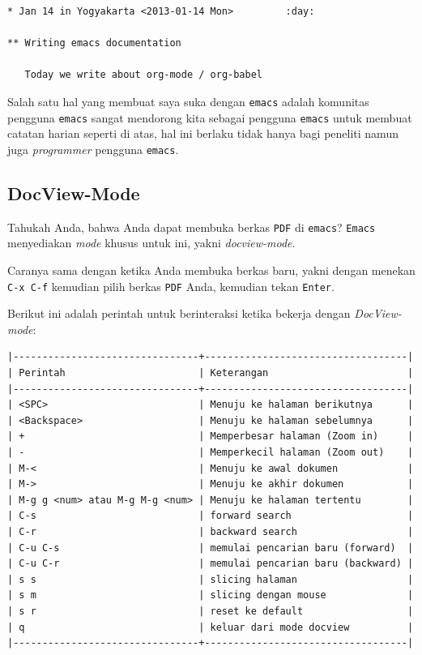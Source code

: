 \documentclass{article}
\begin{document}
\begin{verbatim}
* Jan 14 in Yogyakarta <2013-01-14 Mon>			:day:

** Writing emacs documentation

   Today we write about org-mode / org-babel
\end{verbatim}

Salah satu hal yang membuat saya suka dengan \verb=emacs= adalah komunitas
pengguna \verb=emacs= sangat mendorong kita sebagai pengguna \verb=emacs=
untuk membuat catatan harian seperti di atas, hal ini berlaku tidak hanya
bagi peneliti namun juga \emph{programmer} pengguna \verb=emacs=.

\subsection{DocView-Mode}
Tahukah Anda, bahwa Anda dapat membuka berkas \verb=PDF= di \verb=emacs=?
\verb=Emacs= menyediakan \emph{mode} khusus untuk ini, yakni 
\emph{docview-mode}.

Caranya sama dengan ketika Anda membuka berkas baru, yakni dengan menekan
\verb=C-x C-f= kemudian pilih berkas \verb=PDF= Anda, kemudian tekan 
\verb=Enter=.

Berikut ini adalah perintah untuk berinteraksi ketika bekerja dengan 
\emph{DocView-mode}:

\begin{verbatim}
|--------------------------------+-----------------------------------|
| Perintah                       | Keterangan                        |
|--------------------------------+-----------------------------------|
| <SPC>                          | Menuju ke halaman berikutnya      |
| <Backspace>                    | Menuju ke halaman sebelumnya      |
| +                              | Memperbesar halaman (Zoom in)     |
| -                              | Memperkecil halaman (Zoom out)    |
| M-<                            | Menuju ke awal dokumen            |
| M->                            | Menuju ke akhir dokumen           |
| M-g g <num> atau M-g M-g <num> | Menuju ke halaman tertentu        |
| C-s                            | forward search                    |
| C-r                            | backward search                   |
| C-u C-s                        | memulai pencarian baru (forward)  |
| C-u C-r                        | memulai pencarian baru (backward) |
| s s                            | slicing halaman                   |
| s m                            | slicing dengan mouse              |
| s r                            | reset ke default                  |
| q                              | keluar dari mode docview          |
|--------------------------------+-----------------------------------|
\end{verbatim}
\end{document}
